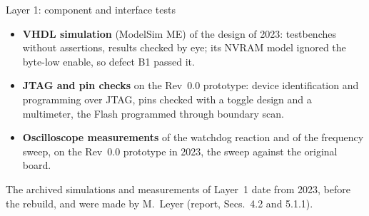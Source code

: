 \begin{frame}{Layer 1: component and interface tests}
  \begin{itemize}
    \item \textbf{VHDL simulation} (ModelSim ME) of the design of 2023: testbenches without assertions, results checked by eye; its NVRAM model ignored the byte-low enable, so defect B1 passed it.
    \item \textbf{JTAG and pin checks} on the Rev~0.0 prototype: device identification and programming over JTAG, pins checked with a toggle design and a multimeter, the Flash programmed through boundary scan.
    \item \textbf{Oscilloscope measurements} of the watchdog reaction and of the frequency sweep, on the Rev~0.0 prototype in 2023, the sweep against the original board.
  \end{itemize}
  \medskip
  \footnotesize The archived simulations and measurements of Layer~1 date from 2023, before the rebuild, and were made by M.~Leyer (report, Secs.~4.2 and 5.1.1).
\end{frame}

